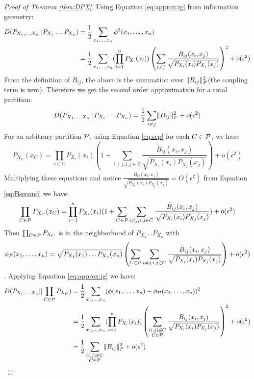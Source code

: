 \begin{proof}[Proof of Theorem \ref{thm:DPX}]
Using Equation \eqref{eq:approx:ig} from information geometry:
\begin{align*}
D(P_{X_1,\dots, X_n}|| P_{X_1}\dots P_{X_n}) & ={1 \over 2} \sum_{x_1,\dots,x_n}\phi^2(x_1,\dots, x_n) \\
& = {1\over 2}\sum_{x_1,\dots,x_n} (\prod_{i=1}^n  P_{X_i} (x_i)) \left(\sum_{i\neq j}{B_{ij}(x_i, x_j) \over \sqrt{P_{X_i}(x_i)P_{X_j}(x_j)} }\right)^2 +o(\epsilon^2) 
\end{align*}
From the definition of $B_{ij}$, the above is the summation over $\norm{B_{ij}}^2_F$(the coupling term is zero). Therefore we get the second order approximation for a total partition:
\begin{equation}
D(P_{X_1,\dots, X_n}|| P_{X_1}\dots P_{X_n}) =   {1 \over 2} \sum_{i\neq j} \norm{B_{ij}}^2_F + o(\epsilon^2)
\end{equation}
For an arbitrary partition $\P$, using Equation \eqref{eq:sep} for each $C\in \P$, we have
\begin{equation}
P_{X_C}(x_C) = \prod_{i\in C} P_{X_i}(x_i)(1+\sum_{i\neq j,i,j\in C} \frac{\tilde{B}_{ij}(x_i, x_j)}{\sqrt{P_{X_i}(x_i)P_{X_j}(x_j)}}) + o(\epsilon^2)
\end{equation}
Multiplying these equations and notice $\frac{\tilde{B}_{ij}(x_i, x_j)}{\sqrt{P_{X_i}(x_i)P_{X_j}(x_j)}}=O(\epsilon^2)$ from
Equation \eqref{eq:Bsecond} we have:
\begin{equation}
\prod_{C\in \P}P_{X_C}(x_C) = \prod_{i=1}^n P_{X_i}(x_i)(1+\sum_{C\in\P}\sum_{i\neq j,i,j\in C}\frac{\tilde{B}_{ij}(x_i, x_j)}{\sqrt{P_{X_i}(x_i)P_{X_j}(x_j)}}) + o(\epsilon^2)
\end{equation}
Then $\prod_{C\in \P}P_{X_C}$ is in the neighborhood of $P_{X_1}\dots P_{X_n}$ with $$\phi_{\P}(x_1,\dots, x_n)=
\sqrt{P_{X_1}(x_1)\dots P_{X_n}(x_n)}\left(\sum_{C\in\P}\sum_{i\neq j,i,j\in C}\frac{\tilde{B}_{ij}(x_i, x_j)}{\sqrt{P_{X_i}(x_i)P_{X_j}(x_j)}}\right)+o(\epsilon^2)$$.
Applying Equation  \eqref{eq:approx:ig} we have:
\begin{align*}
D(P_{X_1,\dots, X_n}|| \prod_{C\in \P}P_{X_C}) & ={1 \over 2} \sum_{x_1,\dots,x_n}(\phi(x_1,\dots, x_n)-\phi_{\P}(x_1, \dots, x_n))^2 \\
& = {1\over 2}\sum_{x_1,\dots,x_n} (\prod_{i=1}^n  P_{X_i} (x_i)) \left(\sum_{\substack{(i,j) \not\in C\\ C\in \P}} {B_{ij}(x_i, x_j) \over \sqrt{P_{X_i}(x_i)P_{X_j}(x_j)} }\right)^2 +o(\epsilon^2) \\
& = \frac{1}{2} \sum_{\substack{(i,j) \not\in C\\ C\in \P}} \norm{B_{ij}}_F^2 + o(\epsilon^2)
\end{align*}
\end{proof}
